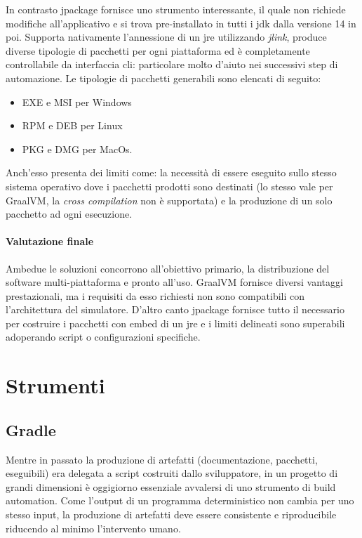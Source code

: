 In contrasto jpackage fornisce uno strumento interessante, il quale non richiede modifiche all'applicativo e si trova pre-installato in tutti i \ac{jdk} dalla versione 14 in poi. Supporta nativamente l'annessione di un \ac{jre} utilizzando \textit{jlink}, produce diverse tipologie di pacchetti per ogni piattaforma ed è completamente controllabile da interfaccia \ac{cli}: particolare molto d'aiuto nei successivi step di automazione. Le tipologie di pacchetti generabili sono elencati di seguito:
\begin{itemize}
	\item EXE e MSI per Windows
	\item RPM e DEB per Linux
	\item PKG e DMG per MacOs.
\end{itemize}
Anch'esso presenta dei limiti come: la necessità di essere eseguito sullo stesso sistema operativo dove i pacchetti prodotti sono destinati (lo stesso vale per GraalVM, la \textit{cross compilation} non è supportata) e la produzione di un solo pacchetto ad ogni esecuzione.

\paragraph{Valutazione finale} Ambedue le soluzioni concorrono all'obiettivo primario, la distribuzione del software multi-piattaforma e pronto all'uso. GraalVM fornisce diversi vantaggi prestazionali, ma i requisiti da esso richiesti non sono compatibili con l'architettura del simulatore. D'altro canto jpackage fornisce tutto il necessario per costruire i pacchetti con embed di un \ac{jre} e i limiti delineati sono superabili adoperando script o configurazioni specifiche.

\section{Strumenti}

\subsection{Gradle}

Mentre in passato la produzione di artefatti (documentazione, pacchetti, eseguibili) era delegata a script costruiti dallo sviluppatore, in un progetto di grandi dimensioni è oggigiorno essenziale avvalersi di uno strumento di build automation. Come l'output di un programma deterministico non cambia per uno stesso input, la produzione di artefatti deve essere consistente e riproducibile riducendo al minimo l'intervento umano. 

